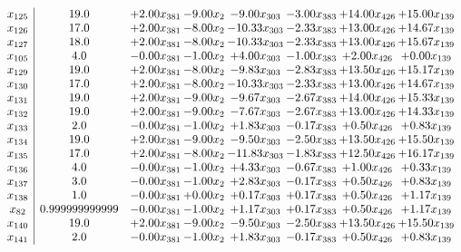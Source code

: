 \documentclass[8pt]{article}
\begin{document}
\[\begin{array}{c| c c@{\hskip 2pt} c@{\hskip 2pt} c@{\hskip 2pt} c@{\hskip 2pt} c@{\hskip 2pt} c@{\hskip 2pt} }
 x_{125}   &  19.0 & +  2.00 x_{381} & -9.00 x_{2} & -9.00 x_{303} & -3.00 x_{383} & + 14.00 x_{426} & + 15.00 x_{139}\\
 x_{126}   &  17.0 & +  2.00 x_{381} & -8.00 x_{2} & -10.33 x_{303} & -2.33 x_{383} & + 13.00 x_{426} & + 14.67 x_{139}\\
 x_{127}   &  18.0 & +  2.00 x_{381} & -8.00 x_{2} & -10.33 x_{303} & -2.33 x_{383} & + 13.00 x_{426} & + 15.67 x_{139}\\
 x_{105}   &  4.0 & -0.00 x_{381} & -1.00 x_{2} & +  4.00 x_{303} & -1.00 x_{383} & +  2.00 x_{426} & +  0.00 x_{139}\\
 x_{129}   &  19.0 & +  2.00 x_{381} & -8.00 x_{2} & -9.83 x_{303} & -2.83 x_{383} & + 13.50 x_{426} & + 15.17 x_{139}\\
 x_{130}   &  17.0 & +  2.00 x_{381} & -8.00 x_{2} & -10.33 x_{303} & -2.33 x_{383} & + 13.00 x_{426} & + 14.67 x_{139}\\
 x_{131}   &  19.0 & +  2.00 x_{381} & -9.00 x_{2} & -9.67 x_{303} & -2.67 x_{383} & + 14.00 x_{426} & + 15.33 x_{139}\\
 x_{132}   &  19.0 & +  2.00 x_{381} & -9.00 x_{2} & -7.67 x_{303} & -2.67 x_{383} & + 13.00 x_{426} & + 14.33 x_{139}\\
 x_{133}   &  2.0 & -0.00 x_{381} & -1.00 x_{2} & +  1.83 x_{303} & -0.17 x_{383} & +  0.50 x_{426} & +  0.83 x_{139}\\
 x_{134}   &  19.0 & +  2.00 x_{381} & -9.00 x_{2} & -9.50 x_{303} & -2.50 x_{383} & + 13.50 x_{426} & + 15.50 x_{139}\\
 x_{135}   &  17.0 & +  2.00 x_{381} & -8.00 x_{2} & -11.83 x_{303} & -1.83 x_{383} & + 12.50 x_{426} & + 16.17 x_{139}\\
 x_{136}   &  4.0 & -0.00 x_{381} & -1.00 x_{2} & +  4.33 x_{303} & -0.67 x_{383} & +  1.00 x_{426} & +  0.33 x_{139}\\
 x_{137}   &  3.0 & -0.00 x_{381} & -1.00 x_{2} & +  2.83 x_{303} & -0.17 x_{383} & +  0.50 x_{426} & +  0.83 x_{139}\\
 x_{138}   &  1.0 & -0.00 x_{381} & +  0.00 x_{2} & +  0.17 x_{303} & +  0.17 x_{383} & +  0.50 x_{426} & +  1.17 x_{139}\\
 x_{82}   &  0.999999999999 & -0.00 x_{381} & -1.00 x_{2} & +  1.17 x_{303} & +  0.17 x_{383} & +  0.50 x_{426} & +  1.17 x_{139}\\
 x_{140}   &  19.0 & +  2.00 x_{381} & -9.00 x_{2} & -9.50 x_{303} & -2.50 x_{383} & + 13.50 x_{426} & + 15.50 x_{139}\\
 x_{141}   &  2.0 & -0.00 x_{381} & -1.00 x_{2} & +  1.83 x_{303} & -0.17 x_{383} & +  0.50 x_{426} & +  0.83 x_{139}\\

\end{array}\]
\end{document}
